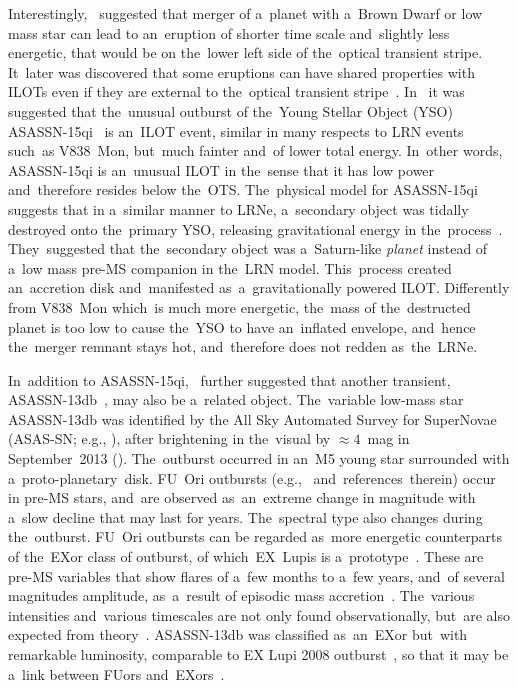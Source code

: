 \documentclass[galaxies,article,accept,moreauthors,pdftex]{mdpi}
\begin{document}
Interestingly,~\cite{Bearetal2011} suggested that merger of a~planet with a~Brown Dwarf or low mass star can lead to an~eruption of shorter time scale and~slightly less energetic, that would be on the~lower left side of the~optical transient stripe. It~later was discovered that some eruptions can have shared properties with ILOTs even if they are external to the~optical transient stripe~\citep{KashiSoker2017, Soker2018}. In~\cite{KashiSoker2017} it was
suggested that the~unusual outburst of the~Young Stellar Object (YSO) ASASSN-15qi~\citep{Herczegetal2016} is an~ILOT event, similar in many respects to LRN events such~as V838~Mon, but~much fainter and~of lower total energy. In~other words, ASASSN-15qi is an~unusual ILOT in the~sense that it has low power and~therefore resides below the~OTS. The~physical model for ASASSN-15qi suggests that in a~similar manner to LRNe, a~secondary object was tidally destroyed onto the~primary YSO, releasing gravitational energy in the~process~\citep{KashiSoker2017}. They~suggested that the~secondary object was a~Saturn-like \textit{planet} instead of a~low mass pre-MS companion in the~LRN model. This~process created an~accretion disk and~manifested as~a~gravitationally powered ILOT. Differently from V838~Mon which~is much more energetic, the~mass of the~destructed planet is too low to cause the~YSO to have an~inflated envelope, and~hence the~merger remnant stays hot, and~therefore does not redden as~the~LRNe.

In~addition to ASASSN-15qi,~\cite{Kashi2018Galaxies} further suggested that another transient, ASASSN-13db~\cite{SiciliaAguilaretal2017}, may also be a~related object. The~variable low-mass star ASASSN-13db was identified by the All Sky Automated Survey for SuperNovae (ASAS-SN; e.g., \cite{Jayasingheetal2019}), after brightening in the~visual by $\approx 4$~mag in September~2013
(\cite{Holoienetal2014, Prietoetal2014, Shappeeetal2014}). The~outburst occurred in an~M5 young star surrounded with a~proto-planetary~disk. FU~Ori outbursts (e.g.,~\cite{HartmannKenyon1996,Audardetal2014} and~references~therein) occur in pre-MS stars, and~are observed as~an~extreme
 change in magnitude with a~slow decline that may last for years. The~spectral type also changes during the~outburst. FU~Ori outbursts can be regarded as~more energetic counterparts of the~EXor class of outburst, of which~EX~Lupis is a~prototype~\citep{Herbig2007}. These are pre-MS variables that show flares of a~few months to a~few years, and~of several magnitudes amplitude, as~a~result of episodic mass accretion~\citep{Herbig1998, Audardetal2014}. The~various intensities and~various timescales are not only found observationally, but~are also expected from theory~\citep{Clarkeetal2005, Zhuetal2009, Vorobyovetal2013}. ASASSN-13db was classified as~an~EXor but~with remarkable luminosity, comparable to EX Lupi 2008 outburst~\citep{Aspinetal2010}, so that it may be a~link between FUors and~EXors~\citep{ContrerasPenaetal2017}.
\end{document}

